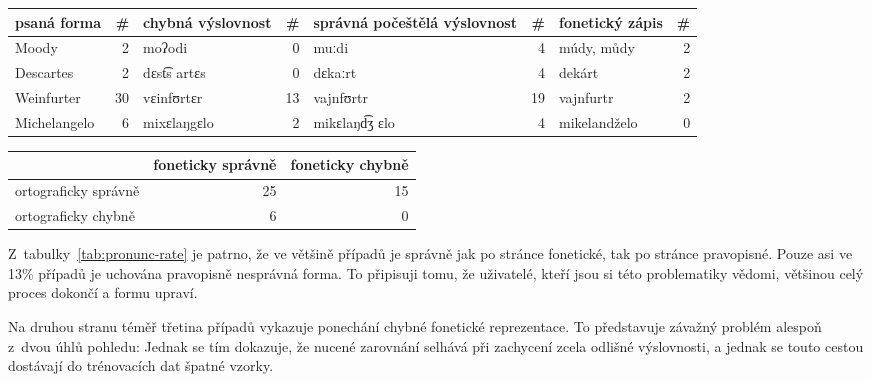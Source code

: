 \begin{table*}[htpb]
\begin{center}
\begin{tabular}{|l r|l r|l r|l r|}
\hline
psaná forma                     & \#
    & chybná výslovnost             & \#
        & správná počeštělá výslovnost  & \#
            & fonetický zápis               & \# \\
\hline
Moody & 2 & moʔodi & 0 & muːdi & 4 & múdy, můdy & 2 \\
Descartes & 2 & dɛst͡s artɛs  & 0 & dɛkaːrt & 4 & dekárt & 2   \\
Weinfurter & 30 & vɛinfʊrtɛr & 13 & vajnfʊrtr & 19 & vajnfurtr & 2 \\
Michelangelo & 6 & mixɛlaŋgɛlo & 2 & mikɛlaŋd͡ʒ ɛlo  & 4 & mikelandželo & 0 \\
\hline
\end{tabular}
\caption{Příklady nestandardní výslovnosti v~manuálních přepisech}
\label{tab:eval-pronunc}
\end{center}
\end{table*}

\begin{table*}[htpb]
\begin{center}
\begin{tabular}{|l|r|r|}
\hline
 & foneticky správně & foneticky chybně \\
\hline
ortograficky správně & 25 & 15 \\
\hline
ortograficky chybně & 6 & 0 \\
\hline
\end{tabular}
\caption{Správnost fonetické a ortografické reprezentece cizích slov na základě
tabulky~\ref{tab:eval-pronunc}}
\label{tab:pronunc-rate}
\end{center}
\end{table*}

Z~tabulky~\ref{tab:pronunc-rate} je patrno, že ve většině případů je správně jak
po stránce fonetické, tak po stránce pravopisné. Pouze asi ve 13\% případů je
uchována pravopisně nesprávná forma. To připisuji tomu, že uživatelé, kteří jsou
si této problematiky vědomi, většinou celý proces dokončí a formu upraví.

Na druhou stranu téměř třetina případů vykazuje ponechání chybné fonetické
reprezentace. To představuje závažný problém alespoň z~dvou úhlů pohledu: Jednak
se tím dokazuje, že nucené zarovnání selhává při zachycení zcela odlišné
výslovnosti, a jednak se touto cestou dostávají do trénovacích dat špatné
vzorky.

